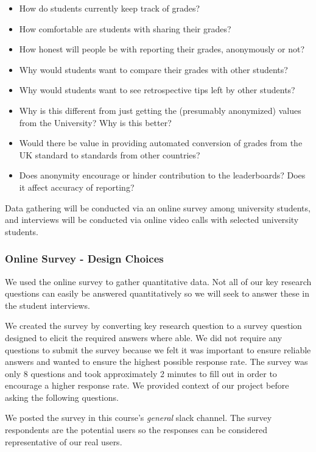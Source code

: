 \begin{itemize}
    \item How do students currently keep track of grades?
    \item How comfortable are students with sharing their grades?
    \item How honest will people be with reporting their grades, anonymously or not?
    \item Why would students want to compare their grades with other students?
    \item Why would students want to see retrospective tips left by other students?
    \item Why is this different from just getting the (presumably anonymized) values from the University? Why is this better?
    \item Would there be value in providing automated conversion of grades from the UK standard to standards from other countries?
    \item Does anonymity encourage or hinder contribution to the leaderboards? Does it affect accuracy of reporting?
\end{itemize}

Data gathering will be conducted via an online survey among university students, and interviews will be conducted via online video calls with selected university students.

\subsubsection{Online Survey - Design Choices}

We used the online survey to gather quantitative data. Not all of our key research questions can easily be answered quantitatively so we will seek to answer these in the student interviews.

We created the survey by converting key research question to a survey question designed to elicit the required answers where able. We did not require any questions to submit the survey because we felt it was important to ensure reliable answers and wanted to ensure the highest possible response rate. The survey was only 8 questions and took approximately 2 minutes to fill out in order to encourage a higher response rate. We provided context of our project before asking the following questions.

We posted the survey in this course's \textit{general} slack channel. The survey respondents are the potential users so the responses can be considered representative of our real users.

